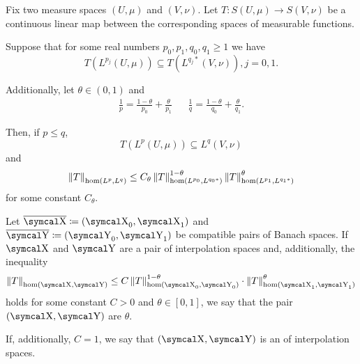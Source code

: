 \begin{theorem}
  Fix two measure spaces \( (U, \mu) \) and \( (V, \nu) \). Let \( T: S(U, \mu) \to S(V, \nu) \) be a continuous linear map between the corresponding spaces of measurable functions.

  Suppose that for some real numbers \( p_0, p_1, q_0, q_1 \geq 1 \) we have
  \begin{equation*}
    T(L^{p_j}(U, \mu)) \subseteq T(L^{q_j *}(V, \nu)), j = 0, 1.
  \end{equation*}

  Additionally, let \( \theta \in (0, 1) \) and
  \begin{align*}
    \frac 1 p = \frac {1 - \theta} {p_0} + \frac {\theta} {p_1}
    &&
    \frac 1 q = \frac {1 - \theta} {q_0} + \frac {\theta} {q_1}.
  \end{align*}

  Then, if \( p \leq q \),
  \begin{equation*}
    T(L^p(U, \mu)) \subseteq L^q(V, \nu)
  \end{equation*}
  and
  \begin{equation*}
    \left\Vert T \right\Vert_{\operatorname{hom}(L^p, L^q)} \leq C_\theta \left\Vert T \right\Vert_{\operatorname{hom}(L^{p_0}, L^{q_0*})}^{1 - \theta} \left\Vert T \right\Vert_{\operatorname{hom}(L^{p_1}, L^{q_1*})}^\theta
  \end{equation*}
  for some constant \( C_\theta \).
\end{theorem}

\begin{definition}\label{def:banach_interpolation_space_exponent}
  Let \( \Ol{\CX} \coloneqq ( \CX_0, \CX_1 ) \) and \( \Ol{\CY} \coloneqq ( \CY_0, \CY_1 ) \) be compatible pairs of Banach spaces. If \( \CX \) and \( \CY \) are a pair of interpolation spaces and, additionally, the inequality
  \begin{equation}\label{da:def:banach_interpolation_space_exponent}
    \Norm{T}_{\Hom(\CX, \CY)} \leq C \Norm{T}_{\Hom(\CX_0, \CY_0)}^{1-\theta} \cdot \Norm{T}_{\Hom(\CX_1, \CY_1)}^{\theta}
  \end{equation}
  holds for some constant \( C > 0 \) and \( \theta \in [0, 1] \), we say that the pair \( (\CX, \CY) \) are  \( \theta \).

  If, additionally, \( C = 1 \), we say that \( (\CX, \CY) \) is an  of interpolation spaces.
\end{definition}

